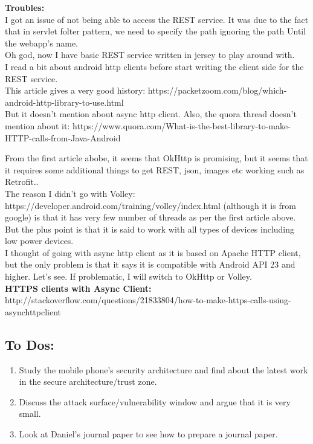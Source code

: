 \documentclass[11pt]{article}
\begin{document}
\textbf{Troubles:}\\
I got an issue of not being able to access the REST service. It was due to the fact that in servlet folter pattern, we need to specify the path 
ignoring the path Until the webapp's name.\\

Oh god, now I have basic REST service written in jersey to play around with.\\

I read a bit about android http clients before start writing the client side for the REST service.\\
This article gives a very good history: https://packetzoom.com/blog/which-android-http-library-to-use.html\\
But it doesn't mention about async http client. Also, the quora thread doesn't mention about it: 
https://www.quora.com/What-is-the-best-library-to-make-HTTP-calls-from-Java-Android

From the first article abobe, it seems that OkHttp is promising, but it seems that it requires some additional things to get REST, json, images etc 
working such as Retrofit..\\

The reason I didn't go with Volley: https://developer.android.com/training/volley/index.html (although it is from google) is that it has very few 
number of threads as per the first article above. But the plus point is that it is said to work with all types of devices including low power 
devices.\\

I thought of going with async http client as it is based on Apache HTTP client, but the only problem is that it says it is compatible with Android 
API 23 and higher. Let's see. If problematic, I will switch to OkHttp or Volley.\\

\textbf{HTTPS clients with Async Client:}\\
http://stackoverflow.com/questions/21833804/how-to-make-https-calls-using-asynchttpclient\\




\pagebreak
\subsection*{To Dos:}
\begin{enumerate}
 \item Study the mobile phone's security architecture and find about the latest work in the secure architecture/trust zone.
 \item Discuss the attack surface/vulnerability window and argue that it is very small.
 \item Look at Daniel's journal paper to see how to prepare a journal paper.
\end{enumerate}
\end{document}
